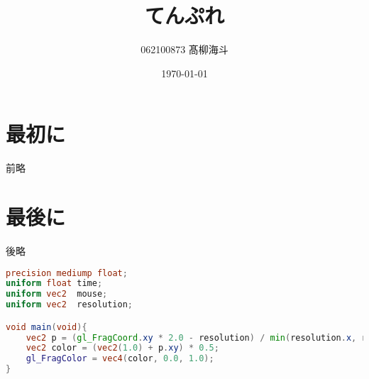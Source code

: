 \documentclass[uplatex,dvipdfmx,ja=standard,a4paper]{bxjsarticle}
\begin{document}
\title{てんぷれ}
\author{062100873 髙柳海斗}
\date{\today}
\maketitle

\section{最初に}
前略

\section{最後に}
後略

\lstset{
	style=customlst,
}
\begin{lstlisting}[caption = sampe1 , label = code1 ,language=GLSL]
precision mediump float;
uniform float time;
uniform vec2  mouse;
uniform vec2  resolution;

void main(void){
	vec2 p = (gl_FragCoord.xy * 2.0 - resolution) / min(resolution.x, resolution.y);
	vec2 color = (vec2(1.0) + p.xy) * 0.5;
	gl_FragColor = vec4(color, 0.0, 1.0);
}
\end{lstlisting}
\end{document}
